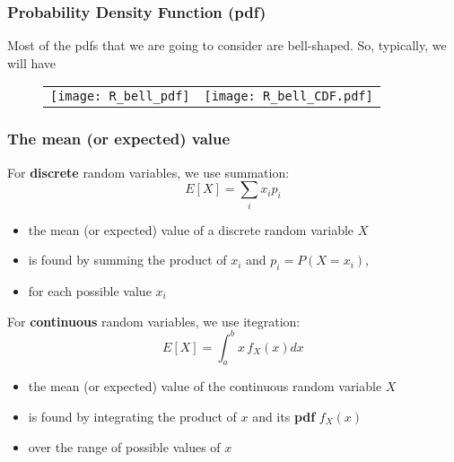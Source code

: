 \documentclass[notes=show,smaller,handout]{beamer}\usepackage[]{graphicx}\usepackage[]{color}
\renewcommand{\Pr}{P}
\newenvironment{stepitemize}{\begin{itemize}[<+->]}{\end{itemize} }
\begin{document}
\begin{frame}%

\frametitle{Probability Density Function (pdf)}

Most of the pdfs that we are going to consider are bell-shaped. So, typically, we will have
\begin{figure}[h]
\begin{center}
\begin{tabular}{cc}
\texttt{[image: R\_bell\_pdf]} & \texttt{[image: R\_bell\_CDF.pdf]} \\
\end{tabular}
\end{center}
\par
\end{figure}


\end{frame}%


\begin{frame}%

\frametitle{The mean (or expected) value}

For \textbf{discrete} random variables, we use summation:%
\begin{equation*}
E\left[ X\right] =\sum_{i}x_{i}p_{i}
\end{equation*}

\begin{stepitemize}
\item the mean (or expected) value of a discrete random variable $X$

\item is found by summing the product of $x_{i}$ and $p_{i}=\Pr (X=x_{i})$,

\item for each possible value $x_{i}$
\end{stepitemize}

\vspace{0.4cm}

For \textbf{continuous} random variables, we use itegration:%
\begin{equation*}
E\left[ X\right] =\int_{a}^{b}x\,f_{X}\left( x\right) dx
\end{equation*}

\begin{stepitemize}
\item the mean (or expected) value of the continuous random variable $X$

\item is found by integrating the product of $x$ and its \textbf{pdf }$%
f_{X}\left( x\right) $

\item over the range of possible values of $x$
\end{stepitemize}

\end{frame}%
\end{document}
